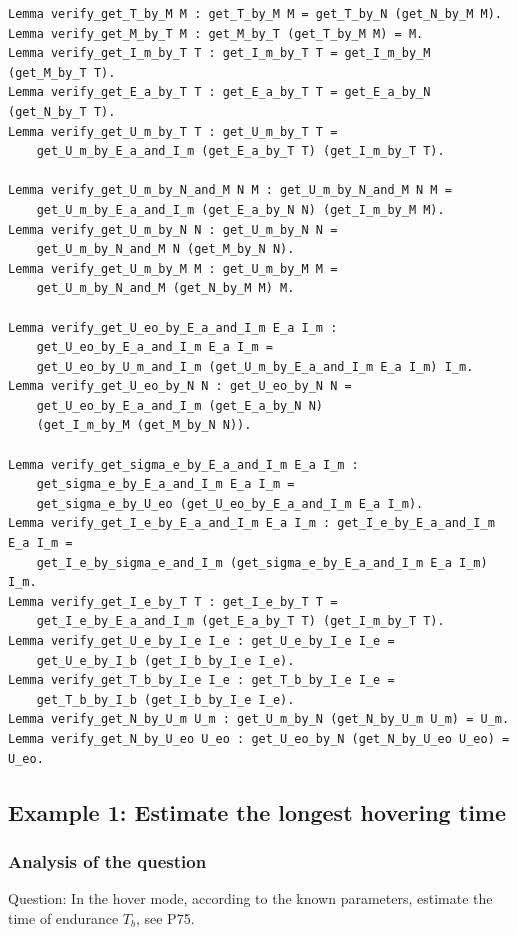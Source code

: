 \documentclass{article} %
\numberwithin{equation}{section} %
\begin{document}
{\small
\begin{verbatim}
Lemma verify_get_T_by_M M : get_T_by_M M = get_T_by_N (get_N_by_M M).
Lemma verify_get_M_by_T M : get_M_by_T (get_T_by_M M) = M.
Lemma verify_get_I_m_by_T T : get_I_m_by_T T = get_I_m_by_M (get_M_by_T T).
Lemma verify_get_E_a_by_T T : get_E_a_by_T T = get_E_a_by_N (get_N_by_T T).
Lemma verify_get_U_m_by_T T : get_U_m_by_T T = 
    get_U_m_by_E_a_and_I_m (get_E_a_by_T T) (get_I_m_by_T T).
    
Lemma verify_get_U_m_by_N_and_M N M : get_U_m_by_N_and_M N M =
    get_U_m_by_E_a_and_I_m (get_E_a_by_N N) (get_I_m_by_M M).
Lemma verify_get_U_m_by_N N : get_U_m_by_N N =
    get_U_m_by_N_and_M N (get_M_by_N N).
Lemma verify_get_U_m_by_M M : get_U_m_by_M M =
    get_U_m_by_N_and_M (get_N_by_M M) M.
		
Lemma verify_get_U_eo_by_E_a_and_I_m E_a I_m : 
    get_U_eo_by_E_a_and_I_m E_a I_m = 
    get_U_eo_by_U_m_and_I_m (get_U_m_by_E_a_and_I_m E_a I_m) I_m.
Lemma verify_get_U_eo_by_N N : get_U_eo_by_N N =
    get_U_eo_by_E_a_and_I_m (get_E_a_by_N N) 
    (get_I_m_by_M (get_M_by_N N)).
    
Lemma verify_get_sigma_e_by_E_a_and_I_m E_a I_m : 
    get_sigma_e_by_E_a_and_I_m E_a I_m = 
    get_sigma_e_by_U_eo (get_U_eo_by_E_a_and_I_m E_a I_m).
Lemma verify_get_I_e_by_E_a_and_I_m E_a I_m : get_I_e_by_E_a_and_I_m E_a I_m = 
    get_I_e_by_sigma_e_and_I_m (get_sigma_e_by_E_a_and_I_m E_a I_m) I_m.
Lemma verify_get_I_e_by_T T : get_I_e_by_T T =
    get_I_e_by_E_a_and_I_m (get_E_a_by_T T) (get_I_m_by_T T).
Lemma verify_get_U_e_by_I_e I_e : get_U_e_by_I_e I_e = 
    get_U_e_by_I_b (get_I_b_by_I_e I_e).
Lemma verify_get_T_b_by_I_e I_e : get_T_b_by_I_e I_e = 
    get_T_b_by_I_b (get_I_b_by_I_e I_e).
Lemma verify_get_N_by_U_m U_m : get_U_m_by_N (get_N_by_U_m U_m) = U_m.
Lemma verify_get_N_by_U_eo U_eo : get_U_eo_by_N (get_N_by_U_eo U_eo) = U_eo.

\end{verbatim}
}


\newpage

\subsection{Example 1: Estimate the longest hovering time}\label{main:example}

\subsubsection{Analysis of the question}
Question: In the hover mode, according to the known parameters, estimate the time of endurance $T_b$, see \cite{qq} P75.
\end{document}
